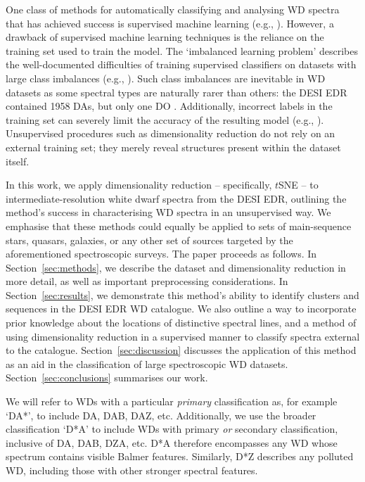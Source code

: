 \documentclass[fleqn,usenatbib]{mnras}
\begin{document}
One class of methods for automatically classifying and analysing WD spectra that has achieved success is supervised machine learning (e.g., \citealt{yang20, tan23, garciazamora23, vincent23, vincent24}).
However, a drawback of supervised machine learning techniques is the reliance on the training set used to train the model.
The `imbalanced learning problem' describes the well-documented difficulties of training supervised classifiers on datasets with large class imbalances (e.g., \citealt{he09, johnson19}).
Such class imbalances are inevitable in WD datasets as some spectral types are naturally rarer than others: the DESI EDR contained 1958 DAs, but only one DO \citep{manser24}.
Additionally, incorrect labels in the training set can severely limit the accuracy of the resulting model (e.g., \citealt{frenay14}).
Unsupervised procedures such as dimensionality reduction do not rely on an external training set; they merely reveal structures present within the dataset itself.

In this work, we apply dimensionality reduction -- specifically, $t$SNE -- to intermediate-resolution white dwarf spectra from the DESI EDR, outlining the method's success in characterising WD spectra in an unsupervised way.
We emphasise that these methods could equally be applied to sets of main-sequence stars, quasars, galaxies, or any other set of sources targeted by the aforementioned spectroscopic surveys.
The paper proceeds as follows.
In Section~\ref{sec:methods}, we describe the dataset and dimensionality reduction in more detail, as well as important preprocessing considerations.
In Section~\ref{sec:results}, we demonstrate this method's ability to identify clusters and sequences in the DESI EDR WD catalogue.
We also outline a way to incorporate prior knowledge about the locations of distinctive spectral lines, and a method of using dimensionality reduction in a supervised manner to classify spectra external to the catalogue.
Section~\ref{sec:discussion} discusses the application of this method as an aid in the classification of large spectroscopic WD datasets.
Section~\ref{sec:conclusions} summarises our work.

We will refer to WDs with a particular \textit{primary} classification as, for example `DA*', to include DA, DAB, DAZ, etc.
Additionally, we use the broader classification `D*A' to include WDs with primary \textit{or} secondary classification, inclusive of DA, DAB, DZA, etc.
D*A therefore encompasses any WD whose spectrum contains visible Balmer features.
Similarly, D*Z describes any polluted WD, including those with other stronger spectral features.
\end{document}
